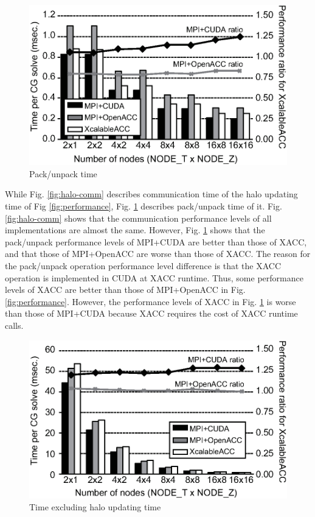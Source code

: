 \begin{figure}[h]
\centering
\includegraphics[scale=0.58,clip]{figs/halo-pack-unpack.eps}
\caption{Pack/unpack time} \label{fig:halo-pack-unpack}
\end{figure}

While Fig. \ref{fig:halo-comm} describes communication time of the halo updating time of Fig \ref{fig:performance},
Fig. \ref{fig:halo-pack-unpack} describes pack/unpack time of it.
Fig. \ref{fig:halo-comm} shows that
the communication performance levels of all implementations are almost the same.
However,
Fig. \ref{fig:halo-pack-unpack} shows that the pack/unpack performance levels of MPI+CUDA are better than those of XACC,
and that those of MPI+OpenACC are worse than those of XACC.
The reason for the pack/unpack operation performance level difference is that the XACC operation is implemented in CUDA at XACC runtime.
Thus,
some performance levels of XACC are better than those of MPI+OpenACC in Fig. \ref{fig:performance}.
However,
the performance levels of XACC in Fig. \ref{fig:halo-pack-unpack} is worse than those of MPI+CUDA because XACC requires the cost of XACC runtime calls.

\begin{figure}[h]
\centering
\includegraphics[scale=0.58,clip]{figs/exceptforhalo.eps}
\caption{Time excluding halo updating time} \label{fig:exceptforhalo}
\end{figure}

